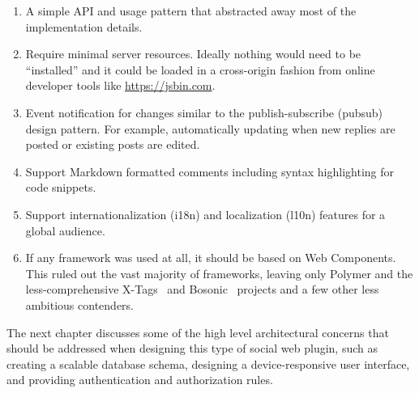 \begin{enumerate}
\item A simple API and usage pattern that abstracted away most of the implementation details.\label{motive:abstraction}

\item Require minimal server resources. Ideally nothing would need to be ``installed'' and it could be loaded in a cross-origin fashion from online developer tools like \url{https://jsbin.com}.
\label{motive:cors}

\item Event notification for changes similar to the 
publish-subscribe (pubsub) design pattern.\label{motive:pubsub} 
For example, automatically updating when new replies are posted or existing posts are edited.

\item Support Markdown formatted comments including syntax highlighting for code snippets.\label{motive:markdown}

\item Support 
internationalization
(i18n) and 
localization (l10n) features for a global audience.\label{motive:i18n}

\item If any framework was used at all, it should be based on Web Components.\label{motive:webcomponents} This ruled out the vast majority of frameworks, 
leaving only Polymer and the less-comprehensive X-Tags~\cite{x-tagscontributors2015} and Bosonic~\cite{bosoniccontributors2014} projects and a few other less ambitious contenders.

\end{enumerate}

The next chapter discusses some of the high level architectural concerns that should be addressed when designing this type of social web plugin, such as creating a scalable database schema, designing a device-responsive user interface, and providing authentication and authorization rules.